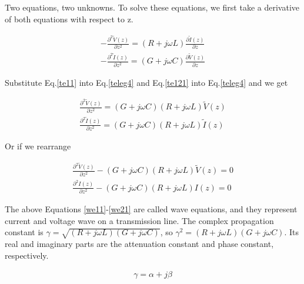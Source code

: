 \documentclass{ximera}
\begin{document}
Two equations, two unknowns. To solve these equations, we first
take a derivative of both equations with respect to z. 

\begin{eqnarray}
-\frac{\partial^2 \tilde{V}(z)}{\partial z^2}=  (R+j\omega L) \frac{\partial
 \tilde{I}(z)}{\partial z}  \label{teleg3} \\
-\frac{\partial^2 \tilde{I}(z)}{\partial z^2}=  (G+j\omega C) \frac{\partial
 \tilde{V}(z)}{\partial z} \label{teleg4}
\end{eqnarray}





Substitute  Eq.\ref{te11} into  Eq.\ref{teleg4}
and Eq.\ref{te121} into Eq.\ref{teleg4} and we get

\begin{eqnarray}
\frac{\partial^2 \tilde{V}(z)}{\partial z^2}=(G+j\omega C)(R+j\omega L) \tilde{V}(z) \label{teleg1} \\
\frac{\partial^2 \tilde{I}(z)}{\partial z^2}= (G+j\omega C)  (R+j\omega L) \label{teleg2}
\tilde{I}(z) 
\end{eqnarray}

Or if we rearrange


\begin{eqnarray}
\frac{\partial^2 \tilde{V}(z)}{\partial z^2} -(G+j\omega C)(R+j\omega L)
 \tilde{V}(z)=0  \label{we11} \\ 
\frac{\partial^2 I(z)}{\partial z^2}- (G+j\omega C)  (R+j\omega L)
I(z)=0 \label{we21}
\end{eqnarray}

The above Equations \ref{we11}-\ref{we21} are called wave equations, and they represent
current and voltage wave on a transmission line. 
The complex propagation constant is
$\gamma=\sqrt{(R+j\omega L)(G+j\omega C)}$,
so $\gamma^2=(R+j\omega L)(G+j\omega C)$.
Its real and imaginary parts are the attenuation constant
and phase constant, respectively.

\begin{eqnarray}
\gamma= \alpha + j \beta \nonumber
\end{eqnarray}
\end{document}
